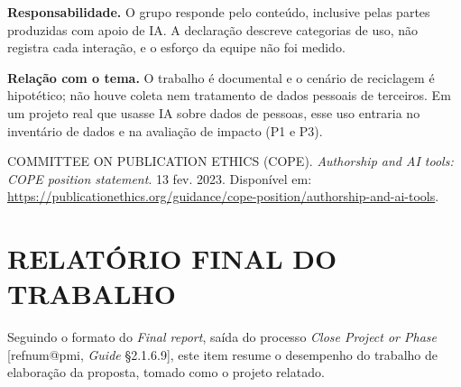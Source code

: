 \documentclass[12pt,a4paper,article,oneside,english,brazil]{abntex2}
\makeatletter
\newcommand{\refnum}[1]{\csname refnum@#1\endcsname}
\makeatother
\begin{document}
\textbf{Responsabilidade.} O grupo responde pelo conteúdo, inclusive pelas partes produzidas com apoio de IA. A declaração descreve categorias de uso, não registra cada interação, e o esforço da equipe não foi medido.

\textbf{Relação com o tema.} O trabalho é documental e o cenário de reciclagem é hipotético; não houve coleta nem tratamento de dados pessoais de terceiros. Em um projeto real que usasse IA sobre dados de pessoas, esse uso entraria no inventário de dados e na avaliação de impacto (P1 e P3).

\begingroup\small\noindent COMMITTEE ON PUBLICATION ETHICS (COPE). \textit{Authorship and AI tools: COPE position statement}. 13 fev. 2023. Disponível em: \url{https://publicationethics.org/guidance/cope-position/authorship-and-ai-tools}.\par\endgroup
\fi

\section{RELATÓRIO FINAL DO TRABALHO}

Seguindo o formato do \textit{Final report}, saída do processo \textit{Close Project or Phase} [\refnum{pmi}, \textit{Guide} §2.1.6.9], este item resume o desempenho do trabalho de elaboração da proposta, tomado como o projeto relatado.
\end{document}
